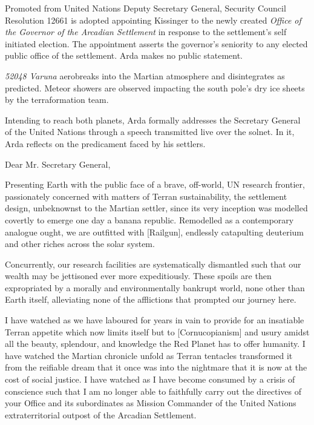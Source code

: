 Promoted from United Nations Deputy Secretary General, Security Council Resolution 12661 is adopted appointing Kissinger to the newly created {\it Office of the Governor of the Arcadian Settlement} in response to the settlement's self initiated election. The appointment asserts the governor's seniority to any elected public office of the settlement. Arda makes no public statement.
\StopTimelineDate

{\it 52048 Varuna} aerobreaks into the Martian atmosphere and disintegrates as predicted. Meteor showers are observed impacting the south pole's dry ice sheets by the terraformation team.
\StopTimelineDate

Intending to reach both planets, Arda formally addresses the Secretary General of the United Nations through a speech transmitted live over the solnet. In it, Arda reflects on the predicament faced by his settlers.

\startTimelineDocument
Dear Mr. Secretary General,

Presenting Earth with the public face of a brave, off-world, UN research frontier, passionately concerned with matters of Terran sustainability, the settlement design, unbeknownst to the Martian settler, since its very inception was modelled covertly to emerge one day a banana republic. Remodelled as a contemporary analogue ought, we are outfitted with [Railgun], endlessly catapulting deuterium and other riches across the solar system. 

Concurrently, our research facilities are systematically dismantled such that our wealth may be jettisoned ever more expeditiously. These spoils are then expropriated by a morally and environmentally bankrupt world, none other than Earth itself, alleviating none of the afflictions that prompted our journey here.

I have watched as we have laboured for years in vain to provide for an insatiable Terran appetite which now limits itself but to [Cornucopianism] and usury amidst all the beauty, splendour, and knowledge the Red Planet has to offer humanity. I have watched the Martian chronicle unfold as Terran tentacles transformed it from the reifiable dream that it once was into the nightmare that it is now at the cost of social justice. I have watched as I have become consumed by a crisis of conscience such that I am no longer able to faithfully carry out the directives of your Office and its subordinates as Mission Commander of the United Nations extraterritorial outpost of the Arcadian Settlement.

